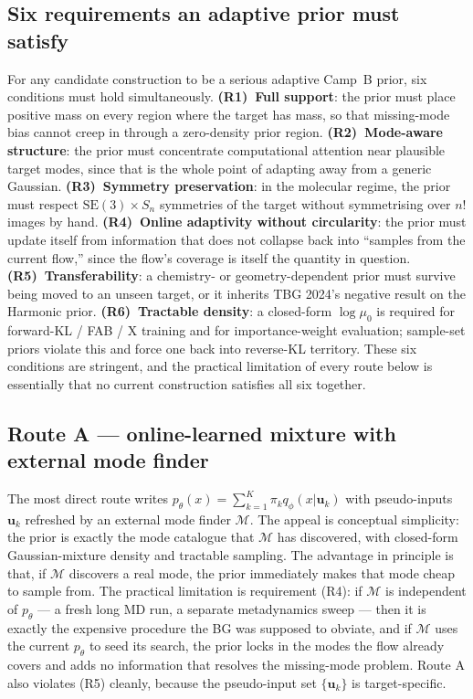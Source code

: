 \documentclass[11pt,letterpaper]{article}
\newcommand{\Xfun}{\mathrm{X}}
\theoremstyle{plain}
\begin{document}
\subsection{Six requirements an adaptive prior must satisfy}

For any candidate construction to be a serious adaptive Camp~B prior, six
conditions must hold simultaneously. \textbf{(R1)~Full support}: the prior
must place positive mass on every region where the target has mass, so
that missing-mode bias cannot creep in through a zero-density prior region.
\textbf{(R2)~Mode-aware structure}: the prior must concentrate computational
attention near plausible target modes, since that is the whole point of
adapting away from a generic Gaussian. \textbf{(R3)~Symmetry preservation}:
in the molecular regime, the prior must respect $\mathrm{SE}(3)\times S_n$
symmetries of the target without symmetrising over $n!$ images by hand.
\textbf{(R4)~Online adaptivity without circularity}: the prior must update
itself from information that does not collapse back into ``samples from the
current flow,'' since the flow's coverage is itself the quantity in
question. \textbf{(R5)~Transferability}: a chemistry- or geometry-dependent
prior must survive being moved to an unseen target, or it inherits TBG
2024's negative result on the Harmonic prior. \textbf{(R6)~Tractable
density}: a closed-form $\log\mu_0$ is required for forward-KL / FAB /
$\Xfun$ training and for importance-weight evaluation; sample-set priors
violate this and force one back into reverse-KL territory. These six
conditions are stringent, and the practical limitation of every route below
is essentially that no current construction satisfies all six together.

\subsection{Route A --- online-learned mixture with external mode finder}

The most direct route writes
$p_\theta(x)=\sum_{k=1}^K\pi_k q_\phi(x|\mathbf u_k)$ with pseudo-inputs
$\mathbf u_k$ refreshed by an external mode finder $\mathcal M$. The
appeal is conceptual simplicity: the prior is exactly the mode catalogue
that $\mathcal M$ has discovered, with closed-form Gaussian-mixture density
and tractable sampling. The advantage in principle is that, if $\mathcal M$
discovers a real mode, the prior immediately makes that mode cheap to
sample from. The practical limitation is requirement (R4): if $\mathcal M$
is independent of $p_\theta$ --- a fresh long MD run, a separate
metadynamics sweep --- then it is exactly the expensive procedure the BG
was supposed to obviate, and if $\mathcal M$ uses the current $p_\theta$ to
seed its search, the prior locks in the modes the flow already covers and
adds no information that resolves the missing-mode problem. Route A also
violates (R5) cleanly, because the pseudo-input set $\{\mathbf u_k\}$ is
target-specific.
\end{document}
